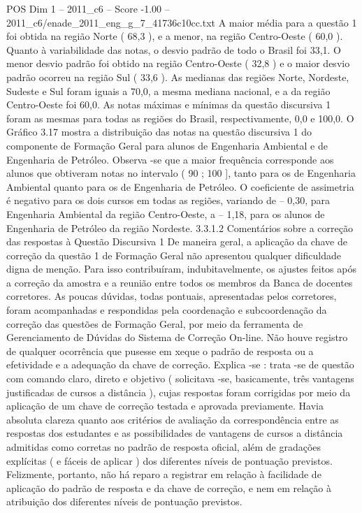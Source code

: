 \begin{textsample}{POS Dim 1 – 2011\_c6 – Score -1.00 – 2011\_c6/enade\_2011\_eng\_g\_7\_41736c10cc.txt}
A maior média para a questão 1 foi obtida na região Norte ( 68,3 ), e a menor, na região Centro-Oeste ( 60,0 ).
Quanto à variabilidade das notas, o desvio padrão de todo o Brasil foi 33,1.
O menor desvio padrão foi obtido na região Centro-Oeste ( 32,8 ) e o maior desvio padrão ocorreu na região Sul ( 33,6 ).
As medianas das regiões Norte, Nordeste, Sudeste e Sul foram iguais a 70,0, a mesma mediana nacional, e a da região Centro-Oeste foi 60,0.
As notas máximas e mínimas da questão discursiva 1 foram as mesmas para todas as regiões do Brasil, respectivamente, 0,0 e 100,0.
O Gráfico 3.17 mostra a distribuição das notas na questão discursiva 1 do componente de Formação Geral para alunos de Engenharia Ambiental e de Engenharia de Petróleo.
Observa -se que a maior frequência corresponde aos alunos que obtiveram notas no intervalo ( 90 ; 100 ], tanto para os de Engenharia Ambiental quanto para os de Engenharia de Petróleo.
O coeficiente de assimetria é negativo para os dois cursos em todas as regiões, variando de – 0,30, para Engenharia Ambiental da região Centro-Oeste, a – 1,18, para os alunos de Engenharia de Petróleo da região Nordeste. 3.3.1.2 Comentários sobre a correção das respostas à Questão Discursiva 1 De maneira geral, a aplicação da chave de correção da questão 1 de Formação Geral não apresentou qualquer dificuldade digna de menção.
Para isso contribuíram, indubitavelmente, os ajustes feitos após a correção da amostra e a reunião entre todos os membros da Banca de docentes corretores.
As poucas dúvidas, todas pontuais, apresentadas pelos corretores, foram acompanhadas e respondidas pela coordenação e subcoordenação da correção das questões de Formação Geral, por meio da ferramenta de Gerenciamento de Dúvidas do Sistema de Correção On-line.
Não houve registro de qualquer ocorrência que pusesse em xeque o padrão de resposta ou a efetividade e a adequação da chave de correção.
Explica -se : trata -se de questão com comando claro, direto e objetivo ( solicitava -se, basicamente, três vantagens justificadas de cursos a distância ), cujas respostas foram corrigidas por meio da aplicação de um chave de correção testada e aprovada previamente.
Havia absoluta clareza quanto aos critérios de avaliação da correspondência entre as respostas dos estudantes e as possibilidades de vantagens de cursos a distância admitidas como corretas no padrão de resposta oficial, além de gradações explícitas ( e fáceis de aplicar ) dos diferentes níveis de pontuação previstos.
Felizmente, portanto, não há reparo a registrar em relação à facilidade de aplicação do padrão de resposta e da chave de correção, e nem em relação à atribuição dos diferentes níveis de pontuação previstos.

\end{textsample}
